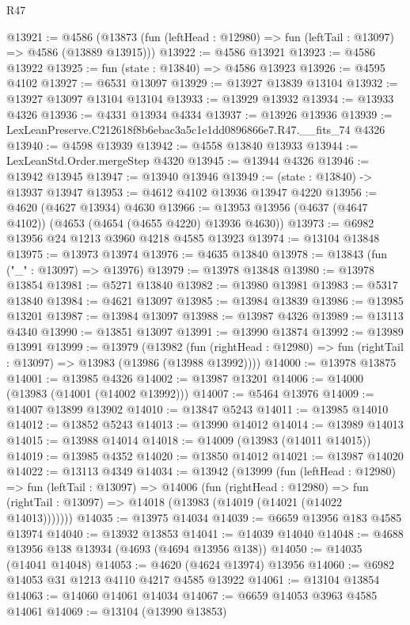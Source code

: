 \begin{lexlean}{R47}
\begin{coremodule}
@13921 := @4586
    (@13873 (fun (leftHead : @12980) => fun (leftTail : @13097) => @4586 (@13889 @13915)))
@13922 := @4586 @13921
@13923 := @4586 @13922
@13925 := fun (state : @13840) => @4586 @13923
@13926 := @4595 @4102
@13927 := @6531 @13097
@13929 := @13927 @13839 @13104
@13932 := @13927 @13097 @13104 @13104
@13933 := @13929 @13932
@13934 := @13933 @4326
@13936 := @4331 @13934 @4334
@13937 := @13926 @13936
@13939 := LexLeanPreserve.C212618f8b6ebac3a5c1e1dd0896866e7.R47.__fits_74 @4326
@13940 := @4598 @13939
@13942 := @4558 @13840 @13933
@13944 := LexLeanStd.Order.mergeStep @4320
@13945 := @13944 @4326
@13946 := @13942 @13945
@13947 := @13940 @13946
@13949 := (state : @13840) -> @13937 @13947
@13953 := @4612 @4102 @13936 @13947 @4220
@13956 := @4620 (@4627 @13934) @4630
@13966 := @13953 @13956 (@4637 (@4647 @4102)) (@4653 (@4654 (@4655 @4220) @13936 @4630))
@13973 := @6982 @13956 @24 @1213 @3960 @4218 @4585 @13923
@13974 := @13104 @13848
@13975 := @13973 @13974
@13976 := @4635 @13840
@13978 := @13843 (fun ("_" : @13097) => @13976)
@13979 := @13978 @13848
@13980 := @13978 @13854
@13981 := @5271 @13840
@13982 := @13980 @13981
@13983 := @5317 @13840
@13984 := @4621 @13097
@13985 := @13984 @13839
@13986 := @13985 @13201
@13987 := @13984 @13097
@13988 := @13987 @4326
@13989 := @13113 @4340
@13990 := @13851 @13097
@13991 := @13990 @13874
@13992 := @13989 @13991
@13999 := @13979
    (@13982
      (fun (rightHead : @12980) => fun (rightTail : @13097) => @13983 (@13986 (@13988 @13992))))
@14000 := @13978 @13875
@14001 := @13985 @4326
@14002 := @13987 @13201
@14006 := @14000 (@13983 (@14001 (@14002 @13992)))
@14007 := @5464 @13976
@14009 := @14007 @13899 @13902
@14010 := @13847 @5243
@14011 := @13985 @14010
@14012 := @13852 @5243
@14013 := @13990 @14012
@14014 := @13989 @14013
@14015 := @13988 @14014
@14018 := @14009 (@13983 (@14011 @14015))
@14019 := @13985 @4352
@14020 := @13850 @14012
@14021 := @13987 @14020
@14022 := @13113 @4349
@14034 := @13942
    (@13999
      (fun (leftHead : @12980) =>
      fun (leftTail : @13097) =>
      @14006
        (fun (rightHead : @12980) =>
        fun (rightTail : @13097) => @14018 (@13983 (@14019 (@14021 (@14022 @14013)))))))
@14035 := @13975 @14034
@14039 := @6659 @13956 @183 @4585 @13974
@14040 := @13932 @13853
@14041 := @14039 @14040
@14048 := @4688 @13956 @138 @13934 (@4693 (@4694 @13956 @138))
@14050 := @14035 (@14041 @14048)
@14053 := @4620 (@4624 @13974) @13956
@14060 := @6982 @14053 @31 @1213 @4110 @4217 @4585 @13922
@14061 := @13104 @13854
@14063 := @14060 @14061 @14034
@14067 := @6659 @14053 @3963 @4585 @14061
@14069 := @13104 (@13990 @13853)

\end{coremodule}
\end{lexlean}
